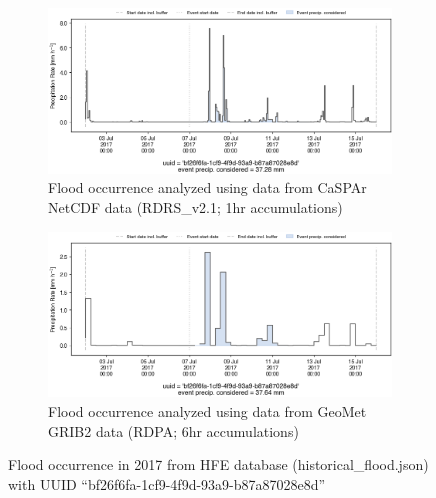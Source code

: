 \documentclass[10pt,a4paper,titlepage,parskip]{scrartcl}
\begin{document}
\begin{figure}[h]
	\begin{subfigure}[a]{1.0\textwidth}
		\centering
		\includegraphics[width=\linewidth]{figures/compare_Geomet_CaSPAr/interpolated_at_stations_occurrence_1362_identified-timesteps_RDRS_v2.1.png}
		\caption{Flood occurrence analyzed using data from CaSPAr NetCDF data (RDRS\_v2.1; 1hr accumulations)}
	\end{subfigure}
	\par\bigskip\bigskip
	\begin{subfigure}[b]{1.0\textwidth}
		\centering
		\includegraphics[width=\linewidth]{figures/compare_Geomet_CaSPAr/interpolated_at_stations_occurrence_1362_identified-timesteps_rdpa:10km:6f.png}
		\caption{Flood occurrence analyzed using data from GeoMet GRIB2 data (RDPA; 6hr accumulations)}
	\end{subfigure}
	\par\bigskip\bigskip
	\caption{Flood occurrence in 2017 from HFE database (historical\_flood.json) with UUID ``bf26f6fa-1cf9-4f9d-93a9-b87a87028e8d''}
\end{figure}
\pagebreak
\end{document}
